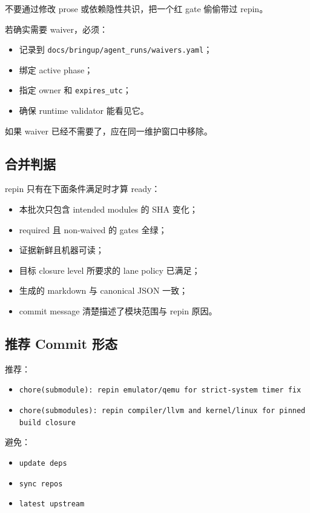 \documentclass[UTF8,11pt,a4paper]{ctexart}
\begin{document}
不要通过修改 prose 或依赖隐性共识，把一个红 gate 偷偷带过 repin。

若确实需要 waiver，必须：

\begin{itemize}
  \item 记录到 \texttt{docs/bringup/agent\_runs/waivers.yaml}；
  \item 绑定 active phase；
  \item 指定 owner 和 \texttt{expires\_utc}；
  \item 确保 runtime validator 能看见它。
\end{itemize}

如果 waiver 已经不需要了，应在同一维护窗口中移除。

\subsection{合并判据}

repin 只有在下面条件满足时才算 ready：

\begin{itemize}
  \item 本批次只包含 intended modules 的 SHA 变化；
  \item required 且 non-waived 的 gates 全绿；
  \item 证据新鲜且机器可读；
  \item 目标 closure level 所要求的 lane policy 已满足；
  \item 生成的 markdown 与 canonical JSON 一致；
  \item commit message 清楚描述了模块范围与 repin 原因。
\end{itemize}

\subsection{推荐 Commit 形态}

推荐：

\begin{itemize}
  \item \texttt{chore(submodule): repin emulator/qemu for strict-system timer fix}
  \item \texttt{chore(submodules): repin compiler/llvm and kernel/linux for pinned build closure}
\end{itemize}

避免：

\begin{itemize}
  \item \texttt{update deps}
  \item \texttt{sync repos}
  \item \texttt{latest upstream}
\end{itemize}
\end{document}
